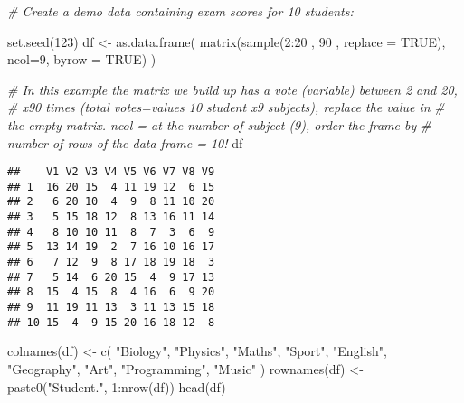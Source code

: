 \documentclass[
]{article}
\newenvironment{Shaded}{\begin{snugshade}}{\end{snugshade}}
\newcommand{\AttributeTok}[1]{\textcolor[rgb]{0.77,0.63,0.00}{#1}}
\newcommand{\CommentTok}[1]{\textcolor[rgb]{0.56,0.35,0.01}{\textit{#1}}}
\newcommand{\ConstantTok}[1]{\textcolor[rgb]{0.00,0.00,0.00}{#1}}
\newcommand{\DecValTok}[1]{\textcolor[rgb]{0.00,0.00,0.81}{#1}}
\newcommand{\FunctionTok}[1]{\textcolor[rgb]{0.00,0.00,0.00}{#1}}
\newcommand{\NormalTok}[1]{#1}
\newcommand{\OtherTok}[1]{\textcolor[rgb]{0.56,0.35,0.01}{#1}}
\newcommand{\SpecialCharTok}[1]{\textcolor[rgb]{0.00,0.00,0.00}{#1}}
\newcommand{\StringTok}[1]{\textcolor[rgb]{0.31,0.60,0.02}{#1}}
\begin{document}
\begin{Shaded}
\begin{Highlighting}[]
\CommentTok{\# Create a demo data containing exam scores for 10 students:}

\FunctionTok{set.seed}\NormalTok{(}\DecValTok{123}\NormalTok{)}
\NormalTok{df }\OtherTok{\textless{}{-}} \FunctionTok{as.data.frame}\NormalTok{(}
  \FunctionTok{matrix}\NormalTok{(}\FunctionTok{sample}\NormalTok{(}\DecValTok{2}\SpecialCharTok{:}\DecValTok{20}\NormalTok{ , }\DecValTok{90}\NormalTok{ , }\AttributeTok{replace =} \ConstantTok{TRUE}\NormalTok{),}
         \AttributeTok{ncol=}\DecValTok{9}\NormalTok{, }\AttributeTok{byrow =} \ConstantTok{TRUE}\NormalTok{)}
\NormalTok{)}

\CommentTok{\# In this example the matrix we build up has a vote (variable) between 2 and 20,}
\CommentTok{\# x90 times (total votes=values 10 student x9 subjects), replace the value in }
\CommentTok{\# the empty matrix. ncol = at the number of subject (9), order the frame by }
\CommentTok{\# number of rows of the data frame = 10!}
\NormalTok{df }
\end{Highlighting}
\end{Shaded}

\begin{verbatim}
##    V1 V2 V3 V4 V5 V6 V7 V8 V9
## 1  16 20 15  4 11 19 12  6 15
## 2   6 20 10  4  9  8 11 10 20
## 3   5 15 18 12  8 13 16 11 14
## 4   8 10 10 11  8  7  3  6  9
## 5  13 14 19  2  7 16 10 16 17
## 6   7 12  9  8 17 18 19 18  3
## 7   5 14  6 20 15  4  9 17 13
## 8  15  4 15  8  4 16  6  9 20
## 9  11 19 11 13  3 11 13 15 18
## 10 15  4  9 15 20 16 18 12  8
\end{verbatim}

\begin{Shaded}
\begin{Highlighting}[]
\FunctionTok{colnames}\NormalTok{(df) }\OtherTok{\textless{}{-}} \FunctionTok{c}\NormalTok{(}
  \StringTok{"Biology"}\NormalTok{, }\StringTok{"Physics"}\NormalTok{, }\StringTok{"Maths"}\NormalTok{, }\StringTok{"Sport"}\NormalTok{, }\StringTok{"English"}\NormalTok{, }
  \StringTok{"Geography"}\NormalTok{, }\StringTok{"Art"}\NormalTok{, }\StringTok{"Programming"}\NormalTok{, }\StringTok{"Music"}
\NormalTok{)}
\FunctionTok{rownames}\NormalTok{(df) }\OtherTok{\textless{}{-}} \FunctionTok{paste0}\NormalTok{(}\StringTok{"Student."}\NormalTok{, }\DecValTok{1}\SpecialCharTok{:}\FunctionTok{nrow}\NormalTok{(df))}
\FunctionTok{head}\NormalTok{(df)}
\end{Highlighting}
\end{Shaded}
\end{document}
